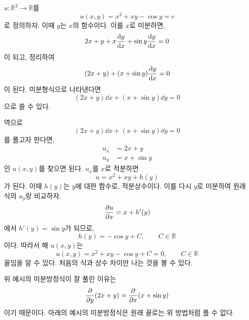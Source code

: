 \documentclass[../engineering_mathematics_lecture_note.tex]{subfiles}
\begin{document}
\begin{example}
    $u: \mathbb R^2 \rightarrow \mathbb R$를
    \begin{equation*}
        u(x, y) = x^2 + xy - \cos y = c
    \end{equation*}
    로 정의하자.
    이때 $y$는 $x$의 함수이다.
    이를 $x$로 미분하면,
    \begin{equation*}
        2x + y + x \dv{y}{x} + \sin y \dv{y}{x} = 0
    \end{equation*}
    이 되고, 정리하여
    \begin{equation*}
        (2x + y) + (x + \sin y) \dv{y}{x} = 0
    \end{equation*}
    이 된다.
    미분형식으로 나타낸다면
    \begin{equation*}
        (2x + y) \dd{x} + (x + \sin y) \dd{y} = 0
    \end{equation*}
    으로 쓸 수 있다.

    역으로
    \begin{equation*}
        (2x + y) \dd{x} + (x + \sin y) \dd{y} = 0
    \end{equation*}
    를 풀고자 한다면,
    \begin{align*}
        u_x &= 2x + y\\
        u_y &= x + \sin y
    \end{align*}
    인 $u(x, y)$를 찾으면 된다.
    $u_x$를 $x$로 적분하면
    \begin{equation*}
        u = x^2 + xy + h(y)
    \end{equation*}
    가 된다.
    이때 $h(y)$는 $y$에 대한 함수로, 적분상수이다.
    이를 다시 $y$로 미분하여 원래 식의 $u_y$랑 비교하자.
    \begin{equation*}
        \pdv{u}{x} = x + h'(y)
    \end{equation*}
    에서 $h'(y) = \sin y$가 되므로,
    \begin{equation*}
        h(y) = -\cos y + C, \qquad C \in \mathbb R
    \end{equation*}
    이다.
    따라서 해 $u(x, y)$는
    \begin{equation*}
        u(x, y) = x^2 + xy - \cos y + C = 0, \qquad C \in \mathbb R
    \end{equation*}
    꼴임을 알 수 있다.
    처음의 식과 상수 차이만 나는 것을 볼 수 있다.
\end{example}

위 예시의 미분방정식이 잘 풀린 이유는
\begin{equation*}
    \pdv{y}(2x + y) = \pdv{x}(x + \sin y)
\end{equation*}
이기 때문이다.
아래의 예시의 미분방정식은 원래 꼴로는 위 방법처럼 풀 수 없다.
\end{document}
